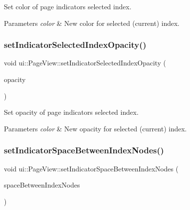Set color of page indicator\textquotesingle{}s selected index. 


\begin{DoxyParams}{Parameters}
{\em color} & New color for selected (current) index. \\
\hline
\end{DoxyParams}
\mbox{\label{classui_1_1PageView_afae2d00e007b00af99a2a372d27d6a1d}} 
\subsubsection{\texorpdfstring{set\+Indicator\+Selected\+Index\+Opacity()}{setIndicatorSelectedIndexOpacity()}}
{\footnotesize\ttfamily void ui\+::\+Page\+View\+::set\+Indicator\+Selected\+Index\+Opacity (\begin{DoxyParamCaption}\item[{G\+Lubyte}]{opacity }\end{DoxyParamCaption})}



Set opacity of page indicator\textquotesingle{}s selected index. 


\begin{DoxyParams}{Parameters}
{\em color} & New opacity for selected (current) index. \\
\hline
\end{DoxyParams}
\mbox{\label{classui_1_1PageView_ac181b03f26045ac2b0be91ed177d03db}} 
\subsubsection{\texorpdfstring{set\+Indicator\+Space\+Between\+Index\+Nodes()}{setIndicatorSpaceBetweenIndexNodes()}\hspace{0.1cm}{\footnotesize\ttfamily [1/2]}}
{\footnotesize\ttfamily void ui\+::\+Page\+View\+::set\+Indicator\+Space\+Between\+Index\+Nodes (\begin{DoxyParamCaption}\item[{float}]{space\+Between\+Index\+Nodes }\end{DoxyParamCaption})}



